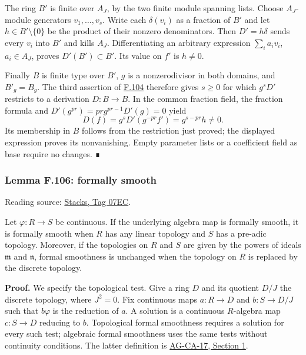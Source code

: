 \documentclass[11pt,a4paper,openany]{report}
\begin{document}
The ring \(B'\) is finite over \(A_J\), by the two finite module spanning lists. Choose \(A_J\)-module generators \(v_1,\ldots,v_s\). Write each \(\delta(v_i)\) as a fraction of \(B'\) and let \(h\in B'\setminus\{0\}\) be the product of their nonzero denominators. Then \(D'=h\delta\) sends every \(v_i\) into \(B'\) and kills \(A_J\). Differentiating an arbitrary expression \(\sum_i a_iv_i\), \(a_i\in A_J\), proves \(D'(B')\subset B'\). Its value on \(f'\) is \(h\ne0\).

Finally \(B\) is finite type over \(B'\), \(g\) is a nonzerodivisor in both domains, and \(B'_g=B_g\). The third assertion of \hyperref[AG-RG-S05-more-algebra-lemma-derivation-extends]{F.104} therefore gives \(s\geq0\) for which \(g^sD'\) restricts to a derivation \(D:B\to B\). In the common fraction field, the fraction formula and \(D'(g^{pr})=prg^{pr-1}D'(g)=0\) yield \[D(f)=g^sD'(g^{-pr}f')=g^{s-pr}h\ne0.\] Its membership in \(B\) follows from the restriction just proved; the displayed expression proves its nonvanishing. Empty parameter lists or a coefficient field as base require no changes. ∎

\label{AG-RG-S05-more-algebra-lemma-formally-smooth}

\subsubsection{Lemma F.106: formally smooth}\label{AG-RG-S05-lemma-f.106-formally-smooth}

Reading source: \href{https://stacks.math.columbia.edu/tag/07EC}{Stacks, Tag 07EC}.

Let \(\varphi:R\to S\) be continuous. If the underlying algebra map is formally smooth, it is formally smooth when \(R\) has any linear topology and \(S\) has a pre-adic topology. Moreover, if the topologies on \(R\) and \(S\) are given by the powers of ideals \(\mathfrak m\) and \(\mathfrak n\), formal smoothness is unchanged when the topology on \(R\) is replaced by the discrete topology.

\textbf{Proof.} We specify the topological test. Give a ring \(D\) and its quotient \(D/J\) the discrete topology, where \(J^2=0\). Fix continuous maps \(a:R\to D\) and \(b:S\to D/J\) such that \(b\varphi\) is the reduction of \(a\). A solution is a continuous \(R\)-algebra map \(c:S\to D\) reducing to \(b\). Topological formal smoothness requires a solution for every such test; algebraic formal smoothness uses the same tests without continuity conditions. The latter definition is \href{https://github.com/KokunoYumeto/open-math-courses/blob/d02d0a3669f42579db037cd44de1d113fdd770a1/docs/courses/AG-CA/src/formally-smooth-unramified-and-etale-ring-maps.md}{AG-CA-17, Section 1}.
\end{document}
